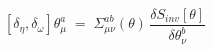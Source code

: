 \begin{equation}\label{eq:gaugecomm}
[\delta_\eta, \delta_\omega ] \theta_\mu^a \;=\; 
\Sigma_{\mu\nu}^{ab} (\theta) \, \frac{\delta S_{inv}[\theta]}{\delta \theta_\nu^b}
\end{equation}


